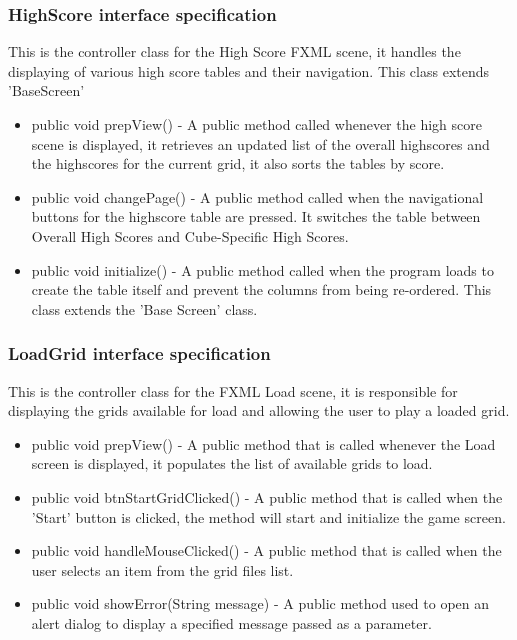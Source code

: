         \subsubsection{HighScore interface specification}
        	This is the controller class for the High Score FXML scene, it handles the displaying of various high score tables and their navigation. This class extends 'BaseScreen'
        	\begin{itemize}
            	\item public void prepView() - A public method called whenever the high score scene is displayed, it retrieves an updated list of the overall highscores and the highscores for the current grid, it also sorts the tables by score.
                \item public void changePage() - A public method called when the navigational buttons for the highscore table are pressed. It switches the table between Overall High Scores and Cube-Specific High Scores.
                \item public void initialize() - A public method called when the program loads to create the table itself and prevent the columns from being re-ordered. This class extends the 'Base Screen' class.
            \end{itemize}
                
        \subsubsection{LoadGrid interface specification}
        	This is the controller class for the FXML Load scene, it is responsible for displaying the grids available for load and allowing the user to play a loaded grid.
            \begin{itemize}
            	\item public void prepView() - A public method that is called whenever the Load screen is displayed, it populates the list of available grids to load.
                \item public void btnStartGridClicked() - A public method that is called when the 'Start' button is clicked, the method will start and initialize the game  screen.
                \item public void handleMouseClicked() - A public method that is called when the user selects an item from the grid files list.
                \item public void showError(String message) - A public method used to open an alert dialog to display a specified message passed as a parameter.
            \end{itemize}
            	
